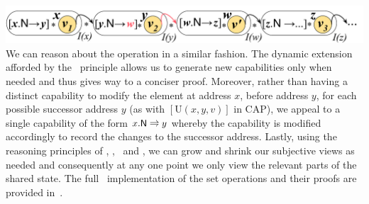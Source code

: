 %
{\centering \includegraphics[scale=0.25]{Sections/Examples/Images/add3.pdf}\\}
%
We can reason about the  operation in a similar fashion. The dynamic extension afforded by the \extendRule\ principle allows us to generate new capabilities only when needed and thus gives way to a conciser proof. 
%
Moreover, rather than having a distinct capability to modify the element at address $x$, before address $y$, for each possible successor address $y$ (as with $[\text{U}(x, y, v)]$ in CAP), we appeal to a single capability of the form $\nextC{x}{y}$ whereby the capability is modified accordingly to record the changes to the successor address. 
%
Lastly, using the reasoning principles of \mergeRule, \forgetRule, \shiftRule\ and \copyRule, we can grow and shrink our subjective views as needed and consequently at any one point we only view the relevant parts of the shared state. 
%
The full \colosl\ implementation of the set operations and their proofs are provided in~\cite{colosl-tr14}. 





